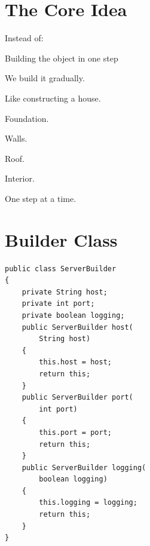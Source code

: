 \documentclass[11pt,a4paper]{book}
\begin{document}
\section{The Core Idea}

Instead of:


Building the object in one step


We build it gradually.


Like constructing a house.


Foundation.


Walls.


Roof.


Interior.


One step at a time.


\section{Builder Class}

\begin{verbatim}
public class ServerBuilder
{
    private String host;
    private int port;
    private boolean logging;
    public ServerBuilder host(
        String host)
    {
        this.host = host;
        return this;
    }
    public ServerBuilder port(
        int port)
    {
        this.port = port;
        return this;
    }
    public ServerBuilder logging(
        boolean logging)
    {
        this.logging = logging;
        return this;
    }
}
\end{verbatim}
\end{document}
